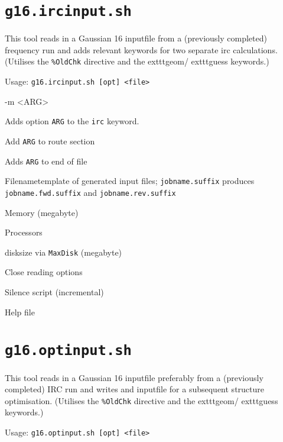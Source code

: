 \documentclass[   %
  final,          %
  a4paper,        %
  rscols=3,       %
  margin=1.0cm,   %
]{refsheet}
\begin{document}
\section{\texttt{g16.ircinput.sh}}

This tool reads in a Gaussian 16 inputfile from a (previously completed) frequency run and 
adds relevant keywords for two separate irc calculations.
(Utilises the \texttt{\%OldChk} directive and the 	exttt{geom}/	exttt{guess} keywords.)

Usage: \texttt{g16.ircinput.sh [opt] <file>}

\begin{rslisttt}{-m <ARG>}
  \item[-o <ARG>] Adds option \texttt{ARG} to the \texttt{irc} keyword.
  \item[-r <ARG>] Add \texttt{ARG} to route section
  \item[-t <ARG>] Adds \texttt{ARG} to end of file
  \item[-f <ARG>] Filenametemplate of generated input files; %
    \texttt{jobname.suffix} produces \texttt{jobname.fwd.suffix} and \texttt{jobname.rev.suffix} 
  \item[-m <INT>] Memory (megabyte)
  \item[-p <INT>] Processors
  \item[-d <INT>] disksize via \texttt{MaxDisk} (megabyte)
  \item[--      ] Close reading options
  \item[-s      ] Silence script (incremental)
  \item[-h      ] Help file 
\end{rslisttt}

\newpage

\section{\texttt{g16.optinput.sh}}

This tool reads in a Gaussian 16 inputfile preferably from a (previously completed) IRC run and 
writes and inputfile for a subsequent structure optimisation.
(Utilises the \texttt{\%OldChk} directive and the 	exttt{geom}/	exttt{guess} keywords.)

Usage: \texttt{g16.optinput.sh [opt] <file>}
\end{document}
